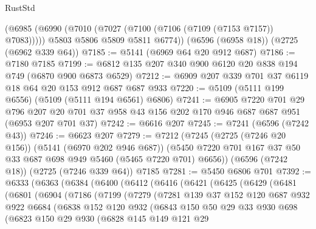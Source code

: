 \begin{lexlean}{RustStd}
\begin{coremodule}
      (@6985
        (@6990 (@7010 (@7027 (@7100 (@7106 (@7109 (@7153 @7157)) @7083)))))
        @5803
        @5806
        @5809
        @5811
        @6774))
    (@6596 (@6958 @18))
    (@2725 (@6962 @339 @64))
@7185 := @5141 (@6969 @64 @20 @912 @687)
@7186 := @7180 @7185
@7199 := @6812 @135 @207 @340 @900 @6120 @20 @838 @194 @749 (@6870 @900 @6873 @6529)
@7212 := @6909 @207 @339 @701 @37 @6119 @18 @64 @20 @153 @912 @687 @687 @933
@7220 := @5109 (@5111 @199 @6556) (@5109 (@5111 @194 @6561) @6806)
@7241 := @6905
    @7220
    @701
    @29
    @796
    @207
    @20
    @701
    @37
    @958
    @43
    @156
    @202
    @170
    @946
    @687
    @687
    @951
    (@6953 @207 @701 @37)
@7242 := @6616 @207
@7245 := @7241 (@6596 (@7242 @43))
@7246 := @6623 @207
@7279 := @7212
    (@7245
      (@2725 (@7246 @20 @156))
      (@5141 (@6970 @202 @946 @687))
      (@5450 @7220 @701 @167 @37 @50 @33 @687 @698 @949 @5460 (@5465 @7220 @701) @6656))
    (@6596 (@7242 @18))
    (@2725 (@7246 @339 @64))
    @7185
@7281 := @5450 @6806 @701
@7392 := @6333
    (@6363
      (@6384
        (@6400
          (@6412
            (@6416
              (@6421
                (@6425
                  (@6429
                    (@6481
                      (@6801
                        (@6904
                          (@7186
                            (@7199
                              (@7279
                                (@7281
                                  @139
                                  @37
                                  @152
                                  @120
                                  @687
                                  @932
                                  @922
                                  @6684
                                  (@6838
                                    @152
                                    @120
                                    @932
                                    (@6843
                                      @150
                                      @50
                                      @29
                                      @33
                                      @930
                                      @698
                                      (@6823
                                        @150
                                        @29
                                        @930
                                        (@6828
                                          @145
                                          @149
                                          @121
                                          @29

\end{coremodule}
\end{lexlean}
